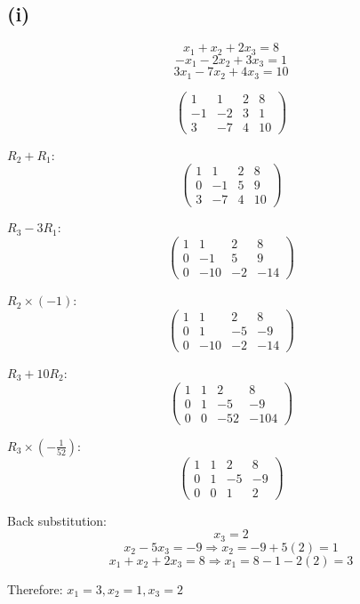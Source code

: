 \subsection*{(i)}
\[
	x_1 + x_2 + 2x_3 = 8
\]
\[
	-x_1 - 2x_2 + 3x_3 = 1
\]
\[
	3x_1 - 7x_2 + 4x_3 = 10
\]

\[
	\begin{pmatrix}
		1  & 1  & 2 & 8  \\
		-1 & -2 & 3 & 1  \\
		3  & -7 & 4 & 10
	\end{pmatrix}
\]

$R_2 + R_1$:
\[
	\begin{pmatrix}
		1 & 1   & 2  & 8   \\
		0 & -1  & 5  & 9   \\
		3  & -7 & 4 & 10
	\end{pmatrix}
\]

$R_3 - 3R_1$:
\[
	\begin{pmatrix}
		1 & 1   & 2  & 8   \\
		0 & -1  & 5  & 9   \\
		0 & -10 & -2 & -14
	\end{pmatrix}
\]

$R_2 \times (-1)$:
\[
	\begin{pmatrix}
		1 & 1   & 2  & 8   \\
		0 & 1   & -5 & -9  \\
		0 & -10 & -2 & -14
	\end{pmatrix}
\]

$R_3 + 10R_2$:
\[
	\begin{pmatrix}
		1 & 1 & 2   & 8    \\
		0 & 1 & -5  & -9   \\
		0 & 0 & -52 & -104
	\end{pmatrix}
\]

$R_3 \times (-\frac{1}{52})$:
\[
	\begin{pmatrix}
		1 & 1 & 2  & 8  \\
		0 & 1 & -5 & -9 \\
		0 & 0 & 1  & 2
	\end{pmatrix}
\]

Back substitution:
\[
	x_3 = 2
\]
\[
	x_2 - 5x_3 = -9 \Rightarrow x_2 = -9 + 5(2) = 1
\]
\[
	x_1 + x_2 + 2x_3 = 8 \Rightarrow x_1 = 8 - 1 - 2(2) = 3
\]

Therefore: $x_1 = 3, x_2 = 1, x_3 = 2$